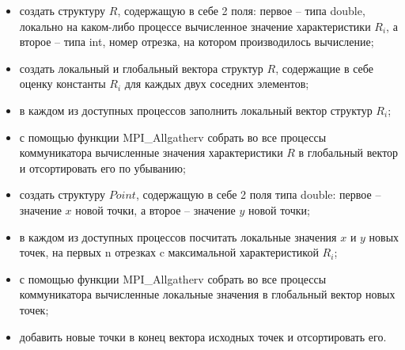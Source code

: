 \documentclass{report}
\begin{document}
\begin{enumerate}
\begin{itemize}
      \item  создать структуру $R$, содержащую в себе 2 поля: первое – типа double, локально на каком-либо процессе вычисленное значение характеристики $R_i$, а второе – типа int, номер отрезка, на котором производилось вычисление;
      \item создать локальный и глобальный вектора структур $R$, содержащие в себе оценку константы $R_i$ для каждых двух соседних элементов;
      \item в каждом из доступных процессов заполнить локальный вектор структур $R_i$;
      \item с помощью функции MPI\_Allgatherv собрать во все процессы коммуникатора вычисленные значения характеристики $R$ в глобальный вектор и отсортировать его по убыванию;
      \item создать структуру $Point$, содержащую в себе 2 поля типа double: первое – значение $x$ новой точки, а второе – значение $y$ новой точки;
      \item в каждом из доступных процессов посчитать локальные значения $x$ и $y$ новых точек, на первых n отрезках c максимальной характеристикой $R_i$;
      \item с помощью функции MPI\_Allgatherv собрать во все процессы коммуникатора вычисленные локальные значения в глобальный вектор новых точек;
      \item добавить новые точки в конец вектора исходных точек и отсортировать его.
    \end{itemize}
\end{enumerate}
\end{document}
